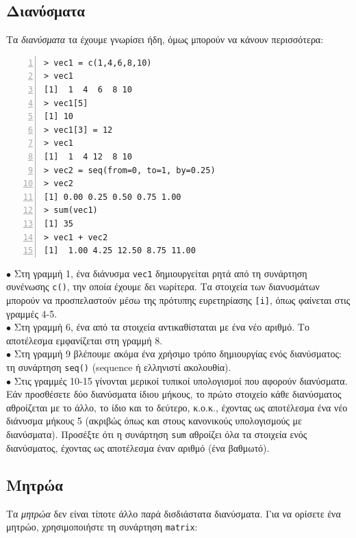 \documentclass[a4paper,10pt,twocolumn]{article}
\begin{document}
\subsection{Διανύσματα}

Τα \emph{διανύσματα} τα έχουμε γνωρίσει ήδη, όμως μπορούν να κάνουν περισσότερα:

\begin{Verbatim}[frame=single,numbers=left,gobble=0, xleftmargin=0.35cm, numbersep=0.1cm]
> vec1 = c(1,4,6,8,10)
> vec1
[1]  1  4  6  8 10
> vec1[5]
[1] 10
> vec1[3] = 12
> vec1
[1]  1  4 12  8 10
> vec2 = seq(from=0, to=1, by=0.25)
> vec2
[1] 0.00 0.25 0.50 0.75 1.00
> sum(vec1)
[1] 35
> vec1 + vec2
[1]  1.00 4.25 12.50 8.75 11.00
\end{Verbatim}

\noindent $\bullet$  Στη γραμμή 1, ένα διάνυσμα \texttt{vec1} δημιουργείται ρητά από τη συνάρτηση συνένωσης
\texttt{c()}, την οποία έχουμε δει νωρίτερα. Τα στοιχεία των διανυσμάτων μπορούν να προσπελαστούν μέσω της
πρότυπης ευρετηρίασης \texttt{[i]}, όπως φαίνεται στις γραμμές 4-5. \\
\noindent $\bullet$  Στη γραμμή 6, ένα από τα στοιχεία αντικαθίσταται με ένα νέο αριθμό. Το αποτέλεσμα
εμφανίζεται στη γραμμή 8.\\
\noindent $\bullet$ Στη γραμμή 9 βλέπουμε ακόμα ένα χρήσιμο τρόπο δημιουργίας ενός διανύσματος: τη συνάρτηση
\texttt{seq()} (sequence ή ελληνιστί ακολουθία). \\
\noindent $\bullet$ Στις γραμμές 10-15 γίνονται μερικοί τυπικοί υπολογισμοί που αφορούν διανύσματα. Εάν
προσθέσετε δύο διανύσματα ίδιου μήκους, το πρώτο στοιχείο κάθε διανύσματος αθροίζεται με το άλλο, το ίδιο
και το δεύτερο, κ.ο.κ., έχοντας ως αποτέλεσμα ένα νέο διάνυσμα μήκους 5 (ακριβώς όπως και στους κανονικούς
υπολογισμούς με διανύσματα). Προσέξτε ότι η συνάρτηση \texttt{sum} αθροίζει όλα τα στοιχεία ενός διανύσματος,
έχοντας ως αποτέλεσμα έναν αριθμό (ένα βαθμωτό).

\subsection{Μητρώα}

Τα \emph{μητρώα} δεν είναι τίποτε άλλο παρά δισδιάστατα διανύσματα. Για να ορίσετε ένα μητρώο, χρησιμοποιήστε
τη συνάρτηση \texttt{matrix}:
\end{document}
